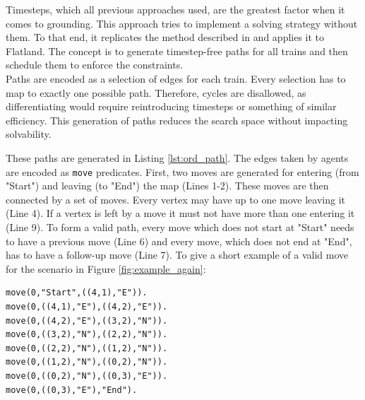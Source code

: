 \documentclass{llncs}
\begin{document}
\begin{multicols*}{2}
Timesteps, which all previous approaches used, are the greatest factor when it comes to grounding. This approach tries to implement a solving strategy without them. To that end, it replicates the method described in \cite[Behrens et al. 2023]{Behrens2023} and applies it to Flatland. The concept is to generate timestep-free paths for all trains and then schedule them to enforce the constraints.\\

Paths are encoded as a selection of edges for each train. Every selection has to map to exactly one possible path. Therefore, cycles are disallowed, as differentiating would require reintroducing timesteps or something of similar efficiency. This generation of paths reduces the search space without impacting solvability.

These paths are generated in Listing \ref{lst:ord_path}. The edges taken by agents are encoded as \texttt{move} predicates. First, two moves are generated for entering (from "Start") and leaving (to "End") the map (Lines 1-2). These moves are then connected by a set of moves. Every vertex may have up to one move leaving it (Line 4). If a vertex is left by a move it must not have more than one entering it (Line 9). To form a valid path, every move which does not start at "Start" needs to have a previous move (Line 6) and every move, which does not end at "End", has to have a follow-up move (Line 7). To give a short example of a valid move for the scenario in Figure \ref{fig:example_again}:

\begin{verbatim}
move(0,"Start",((4,1),"E")).
move(0,((4,1),"E"),((4,2),"E")).
move(0,((4,2),"E"),((3,2),"N")).
move(0,((3,2),"N"),((2,2),"N")).
move(0,((2,2),"N"),((1,2),"N")).
move(0,((1,2),"N"),((0,2),"N")).
move(0,((0,2),"N"),((0,3),"E")).
move(0,((0,3),"E"),"End").
\end{verbatim} 


\end{multicols*}
\end{document}
